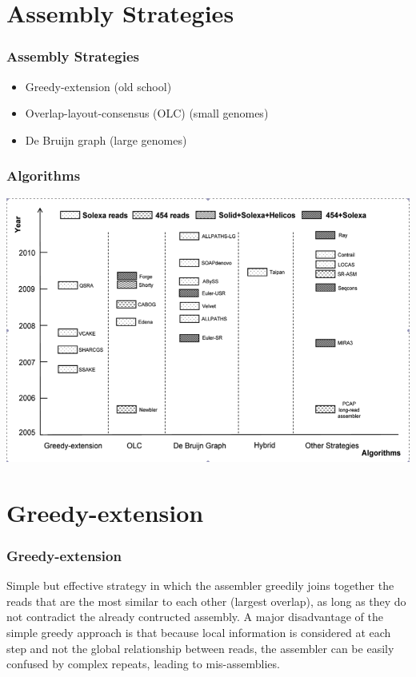 \documentclass[pdf]{beamer}
\begin{document}
%
\section{Assembly Strategies}
\begin{frame}
\frametitle{Assembly Strategies}
\begin{itemize}
\item Greedy-extension (old school)
\item Overlap-layout-consensus (OLC) (small genomes)
\item De Bruijn graph (large genomes)
\end{itemize}
\end{frame}
\begin{frame}
\frametitle{Algorithms}
\begin{center}
\includegraphics[scale=.32]{Figures/algorithms.png} 
\end{center}
\end{frame}

\section{Greedy-extension}
\begin{frame}
\frametitle{Greedy-extension}
Simple but effective strategy in which the assembler greedily joins together the reads that are the most similar to each other (largest overlap), as long as they do not contradict the already contructed assembly. 
\vspace{0.2in}
A major disadvantage of the simple greedy approach is that because local information is considered at each step and not the global relationship between reads, the assembler can be easily confused by complex repeats, leading to mis-assemblies.
\end{frame}
\end{document}
